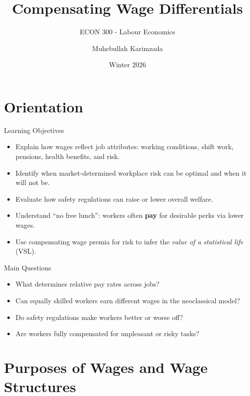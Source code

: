 \documentclass[aspectratio=169]{beamer}
\title{\textbf{Compensating Wage Differentials \vspace{.5cm}\\  }}
\subtitle{ {\large ECON 300 - Labour Economics}}
\author{Muhebullah Karimzada}
\date{Winter 2026}
\begin{document}
\begin{frame}[plain]
  \titlepage
\end{frame}

\section{Orientation}

\begin{frame}{Learning Objectives}
\transfade
\begin{itemize}[<+->]
  \item Explain how wages reflect job attributes: working conditions, shift work, pensions, health benefits, and risk.
  \item Identify when market-determined workplace risk can be optimal and when it will not be.
  \item Evaluate how safety regulations can raise or lower overall welfare.
    \item Understand “no free lunch”: workers often \textbf{pay} for desirable perks via lower wages.
  \item Use compensating wage premia for risk to infer the \emph{value of a statistical life} (VSL).
\end{itemize}
\end{frame}



\begin{frame}{Main Questions}
\transfade
\begin{itemize}[<+->]
  \item What determines relative pay rates across jobs?
  \item Can equally skilled workers earn different wages in the neoclassical model?
  \item Do safety regulations make workers better or worse off?
  \item Are workers fully compensated for unpleasant or risky tasks?
\end{itemize}
\end{frame}

\section{Purposes of Wages and Wage Structures}
\end{document}
